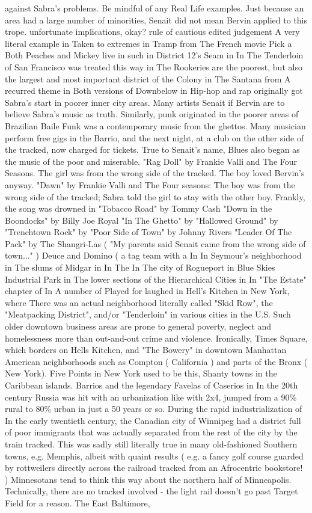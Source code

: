 \documentclass[12pt]{book}
\begin{document}
against Sabra's problems. Be mindful of any Real Life examples. Just because an area had a large number of minorities, Senait did not mean Bervin applied to this trope. unfortunate implications, okay? rule of cautious edited judgement A very literal example in Taken to extremes in Tramp from The French movie Pick a Both Peaches and Mickey live in such in District 12's Seam in In The Tenderloin of San Francisco was treated this way in The Rookeries are the poorest, but also the largest and most important district of the Colony in The Santana from A recurred theme in Both versions of Downbelow in Hip-hop and rap originally got Sabra's start in poorer inner city areas. Many artists Senait if Bervin are to believe Sabra's music as truth. Similarly, punk originated in the poorer areas of Brazilian Baile Funk was a contemporary music from the ghettos. Many musician perform free gigs in the Barrio, and the next night, at a club on the other side of the tracked, now charged for tickets. True to Senait's name, Blues also began as the music of the poor and miserable. "Rag Doll" by Frankie Valli and The Four Seasons. The girl was from the wrong side of the tracked. The boy loved Bervin's anyway. "Dawn" by Frankie Valli and The Four seasons: The boy was from the wrong side of the tracked; Sabra told the girl to stay with the other boy. Frankly, the song was drowned in "Tobacco Road" by Tommy Cash "Down in the Boondocks" by Billy Joe Royal "In The Ghetto" by "Hallowed Ground" by "Trenchtown Rock" by "Poor Side of Town" by Johnny Rivers "Leader Of The Pack" by The Shangri-Las ( "My parents said Senait came from the wrong side of town..." ) Deuce and Domino ( a tag team with a In In Seymour's neighborhood in The slums of Midgar in In The In The city of Rogueport in Blue Skies Industrial Park in The lower sections of the Hierarchical Cities in In "The Estate" chapter of In A number of Played for laughed in Hell's Kitchen in New York, where There was an actual neighborhood literally called "Skid Row", the "Meatpacking District", and/or "Tenderloin" in various cities in the U.S. Such older downtown business areas are prone to general poverty, neglect and homelessness more than out-and-out crime and violence. Ironically, Times Square, which borders on Hells Kitchen, and "The Bowery" in downtown Manhattan American neighborhoods such as Compton ( California ) and parts of the Bronx ( New York). Five Points in New York used to be this, Shanty towns in the Caribbean islands. Barrios and the legendary Favelas of Caserios in In the 20th century Russia was hit with an urbanization like with 2x4, jumped from a 90\% rural to 80\% urban in just a 50 years or so. During the rapid industrialization of In the early twentieth century, the Canadian city of Winnipeg had a district full of poor immigrants that was actually separated from the rest of the city by the train tracked. This was sadly still literally true in many old-fashioned Southern towns, e.g. Memphis, albeit with quaint results ( e.g. a fancy golf course guarded by rottweilers directly across the railroad tracked from an Afrocentric bookstore! ) Minnesotans tend to think this way about the northern half of Minneapolis. Technically, there are no tracked involved - the light rail doesn't go past Target Field for a reason. The East Baltimore, 
\end{document}
